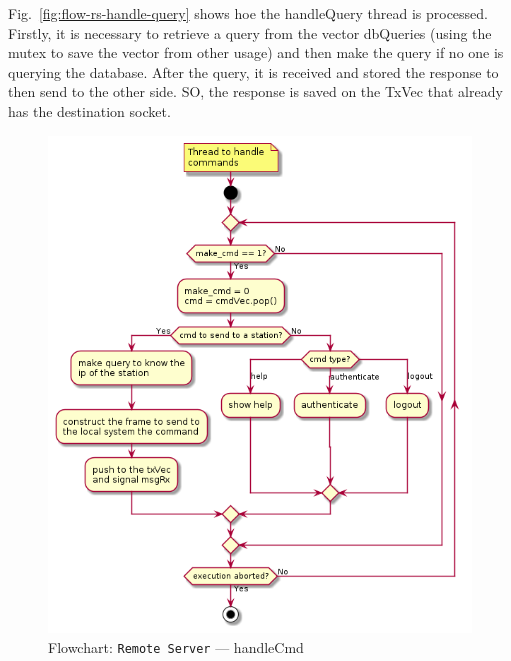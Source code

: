 Fig.~\ref{fig:flow-rs-handle-query} shows hoe the handleQuery thread is processed.
Firstly, it is necessary to retrieve a query from the vector dbQueries (using the mutex to save the vector from other usage) and then make the query if no one is querying the database.
After the query, it is received and stored the response to then send to the other side. SO, the response is saved on the TxVec that already has the destination socket.
%
\begin{figure}[htb!]
\centering
    \includegraphics[width=0.4\columnwidth]{./img/flow-rs-handleCmd.png}
  \caption{Flowchart: \texttt{Remote Server} --- handleCmd}%
\label{fig:flow-rs-handle-cmd}
\end{figure}


